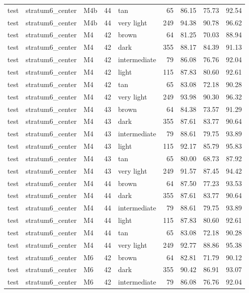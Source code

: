 \begin{tabular}{lllrlrrrr}
test & stratum6\_center & M4b & 44 & tan & 65 & 86.15 & 75.73 & 92.54 \\
test & stratum6\_center & M4b & 44 & very light & 249 & 94.38 & 90.78 & 96.62 \\
test & stratum6\_center & M4 & 42 & brown & 64 & 81.25 & 70.03 & 88.94 \\
test & stratum6\_center & M4 & 42 & dark & 355 & 88.17 & 84.39 & 91.13 \\
test & stratum6\_center & M4 & 42 & intermediate & 79 & 86.08 & 76.76 & 92.04 \\
test & stratum6\_center & M4 & 42 & light & 115 & 87.83 & 80.60 & 92.61 \\
test & stratum6\_center & M4 & 42 & tan & 65 & 83.08 & 72.18 & 90.28 \\
test & stratum6\_center & M4 & 42 & very light & 249 & 93.98 & 90.30 & 96.32 \\
test & stratum6\_center & M4 & 43 & brown & 64 & 84.38 & 73.57 & 91.29 \\
test & stratum6\_center & M4 & 43 & dark & 355 & 87.61 & 83.77 & 90.64 \\
test & stratum6\_center & M4 & 43 & intermediate & 79 & 88.61 & 79.75 & 93.89 \\
test & stratum6\_center & M4 & 43 & light & 115 & 92.17 & 85.79 & 95.83 \\
test & stratum6\_center & M4 & 43 & tan & 65 & 80.00 & 68.73 & 87.92 \\
test & stratum6\_center & M4 & 43 & very light & 249 & 91.57 & 87.45 & 94.42 \\
test & stratum6\_center & M4 & 44 & brown & 64 & 87.50 & 77.23 & 93.53 \\
test & stratum6\_center & M4 & 44 & dark & 355 & 87.61 & 83.77 & 90.64 \\
test & stratum6\_center & M4 & 44 & intermediate & 79 & 88.61 & 79.75 & 93.89 \\
test & stratum6\_center & M4 & 44 & light & 115 & 87.83 & 80.60 & 92.61 \\
test & stratum6\_center & M4 & 44 & tan & 65 & 83.08 & 72.18 & 90.28 \\
test & stratum6\_center & M4 & 44 & very light & 249 & 92.77 & 88.86 & 95.38 \\
test & stratum6\_center & M6 & 42 & brown & 64 & 82.81 & 71.79 & 90.12 \\
test & stratum6\_center & M6 & 42 & dark & 355 & 90.42 & 86.91 & 93.07 \\
test & stratum6\_center & M6 & 42 & intermediate & 79 & 86.08 & 76.76 & 92.04 \\

\end{tabular}
